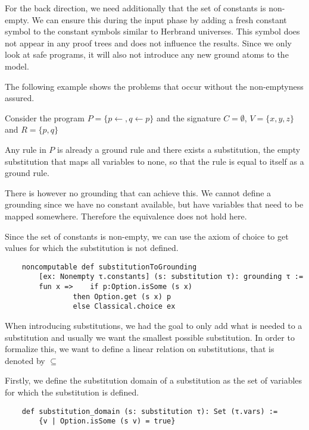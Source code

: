     For the back direction, we need additionally that the set of constants is non-empty. We can ensure this during the input phase by adding a fresh constant symbol to the constant symbols similar to Herbrand universes. This symbol does not appear in any proof trees and does not influence the results. Since we only look at safe programs, it will also not introduce any new ground atoms to the model.

    The following example shows the problems that occur without the non-emptyness assured.

    \begin{example}
        Consider the program $P= \{p \leftarrow, q \leftarrow p\}$ and the signature $C = \emptyset$, $V = \{x,y,z \}$ and $R = \{p,q\}$

        Any rule in $P$ is already a ground rule and there exists a substitution, the empty substitution that maps all variables to none, so that the rule is equal to itself as a ground rule.
        
        There is however no grounding that can achieve this. We cannot define a grounding since we have no constant available, but have variables that need to be mapped somewhere. Therefore the equivalence does not hold here.
    \end{example}

    Since the set of constants is non-empty, we can use the axiom of choice to get values for which the substitution is not defined.

    \begin{lstlisting}
    noncomputable def substitutionToGrounding 
        [ex: Nonempty τ.constants] (s: substitution τ): grounding τ := 
        fun x =>    if p:Option.isSome (s x) 
                then Option.get (s x) p 
                else Classical.choice ex

    \end{lstlisting}

    When introducing substitutions, we had the goal to only add what is needed to a substitution and usually we want the smallest possible substitution. In order to formalize this, we want to define a linear relation on substitutions, that is denoted by $\subseteq$

    Firstly, we define the substitution domain of a substitution as the set of variables for which the substitution is defined. 

    \begin{lstlisting}
    def substitution_domain (s: substitution τ): Set (τ.vars) := 
        {v | Option.isSome (s v) = true}
    \end{lstlisting}

